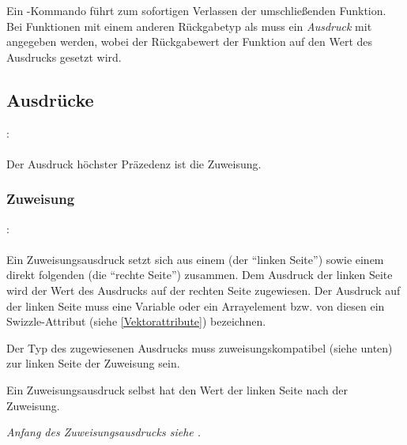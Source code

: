 Ein -Kommando führt zum sofortigen Verlassen der umschließenden Funktion.
Bei Funktionen mit einem anderen Rückgabetyp als  muss ein \emph{Ausdruck} mit angegeben
werden, wobei der Rückgabewert der Funktion auf den Wert des Ausdrucks gesetzt wird.

\subsection{Ausdrücke}\label{Ausdruecke}
:\label{ausdruck}\\
\hspace*{1cm} \Gspace{}\\

Der Ausdruck höchster Präzedenz ist die Zuweisung.


\subsubsection{Zuweisung}\label{Zuweisung}
:\label{asdr_suffix_zuweisung}\\
\hspace*{1cm}\Gt{=}\Gspace{} \\

Ein Zuweisungsausdruck setzt sich aus einem  (der "`linken Seite"') sowie einem
direkt folgenden  (die "`rechte Seite"') zusammen.
Dem Ausdruck der linken Seite wird der Wert des Ausdrucks
auf der rechten Seite zugewiesen. Der Ausdruck auf der linken Seite muss eine Variable oder ein Arrayelement
bzw. von diesen ein Swizzle-Attribut (siehe \ref{Vektorattribute}) bezeichnen.

Der Typ des zugewiesenen Ausdrucks muss zuweisungskompatibel (siehe unten) zur linken Seite der Zuweisung sein.

Ein Zuweisungsausdruck selbst hat den Wert der linken Seite nach der Zuweisung.

\emph{Anfang des Zuweisungsausdrucks siehe .}

